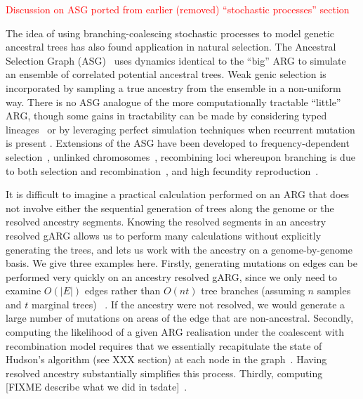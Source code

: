 \documentclass{article}
\begin{document}
\textcolor{red}{Discussion on ASG ported from earlier (removed) ``stochastic processes'' section}

The idea of using branching-coalescing stochastic processes
to model genetic ancestral trees has also found application in natural selection.
The Ancestral Selection Graph (ASG)~\citep{krone1997ancestral,neuhauser1997genealogy}
uses dynamics identical to the ``big'' ARG to simulate an ensemble of correlated
potential ancestral trees. Weak genic selection is incorporated by sampling a
true ancestry from the ensemble in a non-uniform way.
There is no ASG analogue of the more computationally tractable ``little'' ARG,
though some gains in tractability can be made by considering typed
lineages~\citep{etheridge2009coalescent} or by leveraging perfect simulation
techniques when recurrent mutation is present \citep{fearnhead2001perfect}.
Extensions of the ASG have been developed to frequency-dependent
selection~\citep{neuhauser1999ancestral, gonzalezcasanova2018duality},
unlinked chromosomes~\citep{fearnhead2003ancestral}, recombining
loci whereupon branching is due to both selection and
recombination~\citep{donnelly1999genealogical}, and high fecundity
reproduction~\citep{gonzalezcasanova2018duality, koskela2019robust}.

It is difficult to imagine a practical calculation performed on an
ARG that does not involve either the sequential generation of trees
along the genome or the resolved ancestry segments.
Knowing the resolved segments in an ancestry resolved gARG allows
us to perform many calculations without explicitly generating
the trees, and lets us work with the ancestry on a genome-by-genome
basis. We give three examples here. Firstly, generating mutations
on edges can be performed very quickly on an ancestry resolved
gARG, since we only need to examine $O(|E|)$ edges rather than
$O(nt)$ tree branches (assuming $n$ samples and $t$ marginal trees)
~\citep{baumdicker2021efficient}. If the ancestry were not resolved,
we would generate a large number of mutations on areas of the edge that
are non-ancestral. Secondly, computing the likelihood of a given
ARG realisation under the coalescent with recombination model
requires that we essentially recapitulate the state of Hudson's
algorithm (see XXX section) at each node in
the graph~\citep{baumdicker2021efficient}. Having resolved ancestry
substantially simplifies this process. Thirdly, computing
[FIXME describe what we did in tsdate]~\citep{wohns2022unified}.
\end{document}

